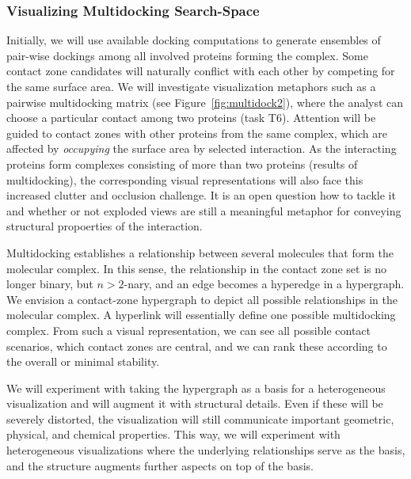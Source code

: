 \documentclass[11pt,a4paper,titlepage,oneside,onecolumn]{article}
\begin{document}
\subsubsection{Visualizing Multidocking Search-Space}
Initially, we will use available docking computations to generate ensembles of pair-wise dockings among all involved proteins forming the complex. 
Some contact zone candidates will naturally conflict with each other by competing for the same surface area. 
We will investigate visualization metaphors such as a pairwise multidocking matrix (see Figure~\ref{fig:multidock2}), where the analyst can choose a particular contact among two proteins (task T6). 
Attention will be guided to contact zones with other proteins from the same complex, which are affected by \emph{occupying} the surface area by selected interaction. As the interacting proteins form complexes consisting of more than two proteins (results of multidocking), the corresponding visual representations will also face this increased clutter and occlusion challenge. It is an open question how to tackle it and whether or not exploded views are still a meaningful metaphor for conveying structural propoerties of the interaction.

Multidocking establishes a relationship between several molecules that form the molecular complex. In this sense, the relationship in the contact zone set is no longer binary, but $n>2$-nary, and an edge becomes a hyperedge in a hypergraph. 
We envision a contact-zone hypergraph to depict all possible relationships in the molecular complex. 
A hyperlink will essentially define one possible multidocking complex. 
From such a visual representation, we can see all possible contact scenarios, which contact zones are central, and we can rank these according to the overall or minimal stability.

We will experiment with taking the hypergraph as a basis for a heterogeneous visualization and will augment it with structural details.
Even if these will be severely distorted, the visualization will still communicate important geometric, physical, and chemical properties. 
This way, we will experiment with heterogeneous visualizations where the underlying relationships serve as the basis, and the structure augments further aspects on top of the basis.


\end{document}
